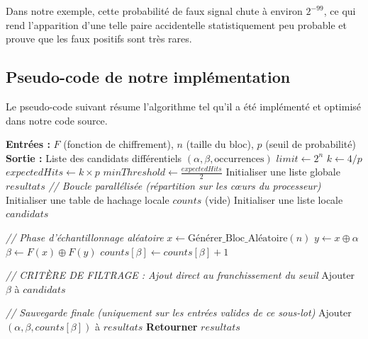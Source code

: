 \documentclass[a4paper,11pt]{article}
\begin{document}
Dans notre exemple, cette probabilité de faux signal chute à environ $2^{-99}$, ce qui rend l'apparition d'une telle paire accidentelle statistiquement peu probable et prouve que les faux positifs sont très rares.

\subsection{Pseudo-code de notre implémentation}

Le pseudo-code suivant résume l’algorithme tel qu’il a été implémenté et optimisé dans notre code source.

\begin{algorithm}[H]
\caption{Recherche Statistique Standard par Échantillonnage}
\label{algo:standard_stat}
\begin{algorithmic}[1]
\Statex \textbf{Entrées :} $F$ (fonction de chiffrement), $n$ (taille du bloc), $p$ (seuil de probabilité)
\Statex \textbf{Sortie :} Liste des candidats différentiels $(\alpha, \beta, \text{occurrences})$
\State $limit \gets 2^n$
\State $k \gets 4 / p$ 
\State $expectedHits \gets k \times p$
\State $minThreshold \gets \frac{expectedHits}{2}$ 
\State Initialiser une liste globale $resultats$
\State \textit{// Boucle parallélisée (répartition sur les cœurs du processeur)}
    \State Initialiser une table de hachage locale $counts$ (vide)
    \State Initialiser une liste locale $candidats$
    
    \State \textit{// Phase d'échantillonnage aléatoire}
        \State $x \gets \text{Générer\_Bloc\_Aléatoire}(n)$
        \State $y \gets x \oplus \alpha$
        \State $\beta \gets F(x) \oplus F(y)$
        \State $counts[\beta] \gets counts[\beta] + 1$
        
        \State \textit{// CRITÈRE DE FILTRAGE : Ajout direct au franchissement du seuil}
            \State Ajouter $\beta$ à $candidats$
        \EndIf
    \EndFor
    
    \State \textit{// Sauvegarde finale (uniquement sur les entrées valides de ce sous-lot)}
        \State Ajouter $(\alpha, \beta, counts[\beta])$ à $resultats$
    \EndFor
\EndFor
\State \textbf{Retourner} $resultats$
\end{algorithmic}
\end{algorithm}
\end{document}
